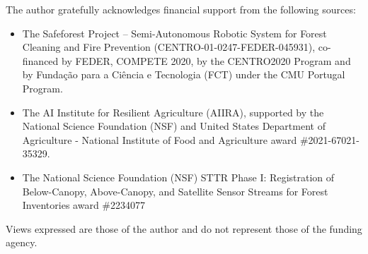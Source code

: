 
\setlength{\parskip}{1em}
\setlength{\parindent}{0em}
The author gratefully acknowledges financial support from the following sources:
\begin{itemize}
    \item The Safeforest Project – Semi-Autonomous Robotic System for Forest Cleaning and Fire Prevention (CENTRO-01-0247-FEDER-045931), co-financed by FEDER, COMPETE 2020, by the CENTRO2020 Program and by Fundação para a Ciência e Tecnologia (FCT) under the CMU Portugal Program.
    \item The AI Institute for Resilient Agriculture (AIIRA), supported by the National Science Foundation (NSF) and United States Department of Agriculture - National Institute of Food and Agriculture award \#2021-67021-35329. 
    \item The National Science Foundation (NSF) STTR Phase I: Registration of Below-Canopy, Above-Canopy, and Satellite Sensor Streams for Forest Inventories award \#2234077 
\end{itemize}
Views expressed are those of the author and do not represent those of the funding agency.

